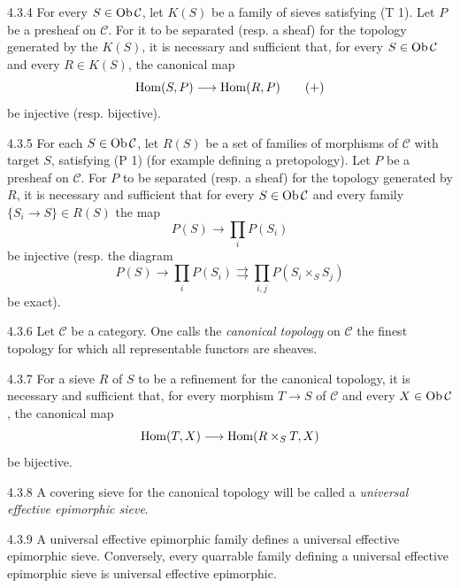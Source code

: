 \begin{corollary}{4.3.4}\label{IV.4.3.4}
For every \(S\in\operatorname{Ob}\mathcal C\), let \(K(S)\) be a family of sieves satisfying
(T 1). Let \(P\) be a presheaf on \(\mathcal C\). For it to be separated
(resp. a sheaf) for the topology generated by the \(K(S)\), it is necessary
and sufficient that, for every \(S\in\operatorname{Ob}\mathcal C\) and every \(R\in K(S)\),
the canonical map
\[
\operatorname{Hom}(S,P)\longrightarrow\operatorname{Hom}(R,P)\tag{+}
\]
be injective (resp. bijective).
\end{corollary}

\begin{corollary}{4.3.5}\label{IV.4.3.5}
For each \(S\in\operatorname{Ob}\mathcal C\), let \(R(S)\) be a set of families of morphisms
of \(\mathcal C\) with target \(S\), satisfying (P 1) (for example defining a
pretopology). Let \(P\) be a presheaf on \(\mathcal C\). For \(P\) to be separated
(resp. a sheaf) for the topology generated by \(R\), it is necessary and sufficient
that for every \(S\in\operatorname{Ob}\mathcal C\) and every family \(\{S_i\to S\}\in R(S)\)
the map
\[
P(S)\longrightarrow\prod_i P(S_i)
\]
be injective (resp. the diagram
\[
P(S)\longrightarrow\prod_i P(S_i)
\rightrightarrows\prod_{i,j}P(S_i\times_S S_j)
\]
be exact).
\end{corollary}

\begin{definition}{4.3.6}\label{IV.4.3.6}
Let \(\mathcal C\) be a category. One calls the \emph{canonical topology}
on \(\mathcal C\) the finest topology for which all representable functors
are sheaves.
\end{definition}
\begin{corollary}{4.3.7}\label{IV.4.3.7}
For a sieve \(R\) of \(S\) to be a refinement for the canonical topology,
it is necessary and sufficient that, for every morphism \(T\to S\) of
\(\mathcal C\) and every \(X\in\operatorname{Ob}\mathcal C\), the canonical map
\[
\operatorname{Hom}(T,X)\longrightarrow\operatorname{Hom}(R\times_S T,X)
\]
be bijective.
\end{corollary}
\begin{definition}{4.3.8}\label{IV.4.3.8}
A covering sieve for the canonical topology will be called a
\emph{universal effective epimorphic sieve}.
\end{definition}
\begin{corollary}{4.3.9}\label{IV.4.3.9}
A universal effective epimorphic family defines a universal effective
epimorphic sieve. Conversely, every quarrable family defining a
universal effective epimorphic sieve is universal effective epimorphic.
\end{corollary}

